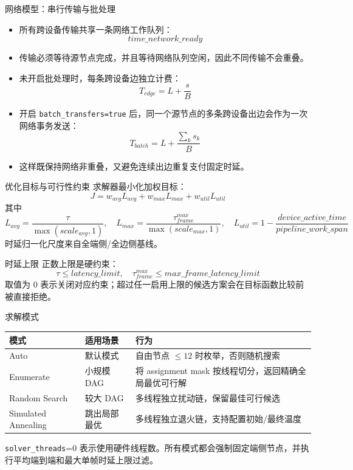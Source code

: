 \documentclass[aspectratio=169]{ctexbeamer}
\begin{document}
\begin{frame}{网络模型：串行传输与批处理}
  \begin{itemize}
    \item 所有跨设备传输共享一条网络工作队列：
      \[
        time\_network\_ready
      \]
    \item 传输必须等待源节点完成，并且等待网络队列空闲，因此不同传输不会重叠。
    \item 未开启批处理时，每条跨设备边独立计费：
      \[
        T_{edge}=L+\frac{s}{B}
      \]
    \item 开启 \texttt{batch\_transfers=true} 后，同一个源节点的多条跨设备出边会作为一次网络事务发送：
      \[
        T_{batch}=L+\frac{\sum_k s_k}{B}
      \]
    \item 这样既保持网络非重叠，又避免连续出边重复支付固定时延。
  \end{itemize}
\end{frame}

\begin{frame}{优化目标与可行性约束}
  \small
  求解器最小化加权目标：
  \[
    J =
    w_{avg} L_{avg}
    + w_{max} L_{max}
    + w_{util} L_{util}
  \]
  其中
  \[
    L_{avg}=\frac{\tau}{\max(scale_{avg}, 1)},\quad
    L_{max}=\frac{\tau_{frame}^{max}}{\max(scale_{max}, 1)},\quad
    L_{util}=1-\frac{device\_active\_time}{pipeline\_work\_span}
  \]
  时延归一化尺度来自全端侧/全边侧基线。
  \vspace{0.25em}
  \begin{block}{时延上限}
    正数上限是硬约束：
    \[
      \tau \leq latency\_limit,\quad
      \tau_{frame}^{max} \leq max\_frame\_latency\_limit
    \]
    取值为 0 表示关闭对应约束；超过任一启用上限的候选方案会在目标函数比较前被直接拒绝。
  \end{block}
\end{frame}

\begin{frame}{求解模式}
  \begin{table}
    \centering
    \small
    \begin{tabular}{p{}p{}p{}}
      \toprule
      模式 & 适用场景 & 行为 \\
      \midrule
      Auto & 默认模式 & 自由节点 $\leq 12$ 时枚举，否则随机搜索 \\
      Enumerate & 小规模 DAG & 将 assignment mask 按线程切分，返回精确全局最优可行解 \\
      Random Search & 较大 DAG & 多线程独立扰动链，保留最佳可行候选 \\
      Simulated Annealing & 跳出局部最优 & 多线程独立退火链，支持配置初始/最终温度 \\
      \bottomrule
    \end{tabular}
  \end{table}
  \vspace{0.5em}
  \texttt{solver\_threads}=0 表示使用硬件线程数。所有模式都会强制固定端侧节点，并执行平均端到端和最大单帧时延上限过滤。
\end{frame}
\end{document}
